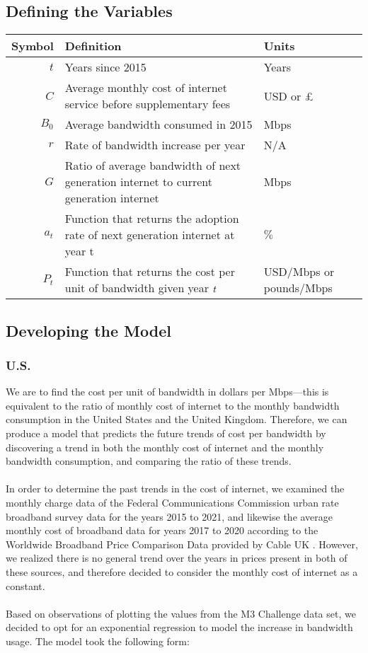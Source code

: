 \documentclass[12pt]{article}
\begin{document}
\subsection{Defining the Variables}


\begin{tabular}{|r|p{4.15in}|p{1.2in}|}
\hline
\textbf{Symbol} & \textbf{Definition} & \textbf{Units}
\\
\hline
$t$ & Years since 2015 & Years
\\
\hline
$C$ & Average monthly cost of internet service before supplementary fees & USD or £
\\
\hline
$B_{0}$ & Average bandwidth consumed in 2015 & Mbps
\\
\hline
$r$ & Rate of bandwidth increase per year & N/A
\\
\hline 
$G$ & Ratio of average bandwidth of next generation internet to current generation internet & Mbps
\\
\hline
$a_t$ & Function that returns the adoption rate of next generation internet at year t & $\%$
\\
\hline
$P_{t}$ & Function that returns the cost per unit of bandwidth given year $\emph{t}$ & USD/Mbps or pounds/Mbps
\\
\hline
\end{tabular}

\subsection{Developing the Model}

\subsubsection{U.S.}

We are to find the cost per unit of bandwidth in dollars per Mbps—this is equivalent to the ratio of monthly cost of internet to the monthly bandwidth consumption in the United States and the United Kingdom. Therefore, we can produce a model that predicts the future trends of cost per bandwidth by discovering a trend in both the monthly cost of internet and the monthly bandwidth consumption, and comparing the ratio of these trends. 
\\
\\
In order to determine the past trends in the cost of internet, we examined the monthly charge data of the Federal Communications Commission urban rate broadband survey data \cite{FCCData} for the years 2015 to 2021, and likewise the average monthly cost of broadband data for years 2017 to 2020 according to the Worldwide Broadband Price Comparison Data provided by Cable UK \cite{CableUK}. However, we realized there is no general trend over the years in prices present in both of these sources, and therefore decided to consider the monthly cost of internet as a constant. 
\\
\\
Based on observations of plotting the values from the M3 Challenge data set, we decided to opt for an exponential regression to model the increase in bandwidth usage. The model took the following form:
\end{document}
